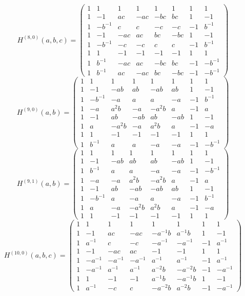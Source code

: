 \documentclass[11pt,a4paper]{article}
\theoremstyle{plain}
\theoremstyle{definition}
\numberwithin{equation}{section}
\begin{document}
\medskip
{\small\setlength{\arraycolsep}{5pt}$$H^{(8,0)}(a,b,c)=
\begin{pmatrix}
1&1&1&1&1&1&1&1\\1&-1&ac&-ac&-bc&bc&1&-1\\1&-b^{-1}&c&c&-c&-c&-1&b^{-1}\\1&-1&-ac&ac&bc&-bc&1&-1\\1&-b^{-1}&-c&-c&c&c&-1&b^{-1}\\1&1&-1&-1&-1&-1&1&1\\1&b^{-1}&-ac&ac&-bc&bc&-1&-b^{-1}\\1&b^{-1}&ac&-ac&bc&-bc&-1&-b^{-1}
\end{pmatrix}$$}
\medskip
{\small\setlength{\arraycolsep}{5pt}$$H^{(9,0)}(a,b)=
\begin{pmatrix}
1&1&1&1&1&1&1&1\\1&-1&-ab&ab&-ab&ab&1&-1\\1&-b^{-1}&-a&a&a&-a&-1&b^{-1}\\1&-a&a^{2}b&-a&-a^{2}b&a&-1&a\\1&-1&ab&-ab&ab&-ab&1&-1\\1&a&-a^{2}b&-a&a^{2}b&a&-1&-a\\1&1&-1&-1&-1&-1&1&1\\1&b^{-1}&a&a&-a&-a&-1&-b^{-1}
\end{pmatrix}$$}
\medskip
{\small\setlength{\arraycolsep}{5pt}$$H^{(9,1)}(a,b)=
\begin{pmatrix}
1&1&1&1&1&1&1&1\\1&-1&-ab&ab&ab&-ab&1&-1\\1&b^{-1}&a&a&-a&-a&-1&-b^{-1}\\1&-a&-a&a^{2}b&-a^{2}b&a&-1&a\\1&-1&ab&-ab&-ab&ab&1&-1\\1&-b^{-1}&a&-a&a&-a&-1&b^{-1}\\1&a&-a&-a^{2}b&a^{2}b&a&-1&-a\\1&1&-1&-1&-1&-1&1&1
\end{pmatrix}$$}
\medskip
{\small\setlength{\arraycolsep}{5pt}$$H^{(10,0)}(a,b,c)=
\begin{pmatrix}
1&1&1&1&1&1&1&1\\1&-1&ac&-ac&-a^{-1}b&a^{-1}b&1&-1\\1&a^{-1}&c&-c&-a^{-1}&-a^{-1}&-1&a^{-1}\\1&-1&-ac&ac&-1&-1&1&1\\1&-a^{-1}&-a^{-1}&-a^{-1}&a^{-1}&a^{-1}&-1&a^{-1}\\1&-a^{-1}&a^{-1}&a^{-1}&a^{-2}b&-a^{-2}b&-1&-a^{-1}\\1&1&-1&-1&a^{-1}b&-a^{-1}b&1&-1\\1&a^{-1}&-c&c&-a^{-2}b&a^{-2}b&-1&-a^{-1}
\end{pmatrix}$$}
\end{document}
